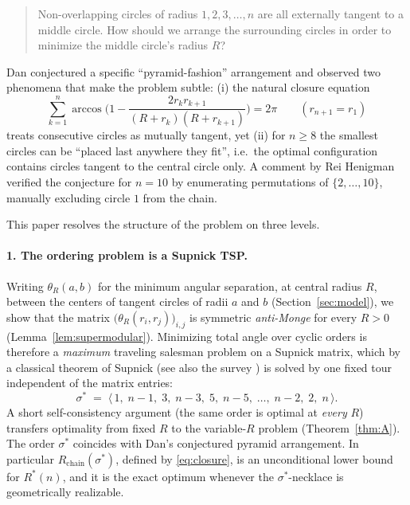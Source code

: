 \documentclass[11pt]{article}
\theoremstyle{definition}
\theoremstyle{remark}
\begin{document}
\begin{quote}
Non-overlapping circles of radius $1,2,3,\dots,n$ are all externally tangent to a middle circle. How should we arrange the surrounding circles in order to minimize the middle circle's radius $R$?
\end{quote}

Dan conjectured a specific ``pyramid-fashion'' arrangement and observed two phenomena that make the problem subtle: (i) the natural closure equation
\begin{equation}\label{eq:closure}
\sum_{k=1}^{n}\arccos\!\Big(1-\frac{2r_kr_{k+1}}{(R+r_k)(R+r_{k+1})}\Big)=2\pi
\qquad (r_{n+1}=r_1)
\end{equation}
treats consecutive circles as mutually tangent, yet (ii) for $n\ge 8$ the smallest circles can be ``placed last anywhere they fit'', i.e.\ the optimal configuration contains circles tangent to the central circle only. A comment by Rei Henigman \cite{mse} verified the conjecture for $n=10$ by enumerating permutations of $\{2,\dots,10\}$, manually excluding circle $1$ from the chain.

This paper resolves the structure of the problem on three levels.

\paragraph{1. The ordering problem is a Supnick TSP.}
Writing $\theta_R(a,b)$ for the minimum angular separation, at central radius $R$, between the centers of tangent circles of radii $a$ and $b$ (Section~\ref{sec:model}), we show that the matrix $\big(\theta_R(r_i,r_j)\big)_{i,j}$ is symmetric \emph{anti-Monge} for every $R>0$ (Lemma~\ref{lem:supermodular}). Minimizing total angle over cyclic orders is therefore a \emph{maximum} traveling salesman problem on a Supnick matrix, which by a classical theorem of Supnick \cite{supnick} (see also the survey \cite{bdvvw}) is solved by one fixed tour independent of the matrix entries:
\[
\sigma^\ast \;=\; \langle\, 1,\; n-1,\; 3,\; n-3,\; 5,\; n-5,\;\dots,\; n-2,\; 2,\; n \,\rangle .
\]
A short self-consistency argument (the same order is optimal at \emph{every} $R$) transfers optimality from fixed $R$ to the variable-$R$ problem (Theorem~\ref{thm:A}). The order $\sigma^\ast$ coincides with Dan's conjectured pyramid arrangement. In particular $R_{\mathrm{chain}}(\sigma^\ast)$, defined by \eqref{eq:closure}, is an unconditional lower bound for $R^\ast(n)$, and it is the exact optimum whenever the $\sigma^\ast$-necklace is geometrically realizable.
\end{document}
